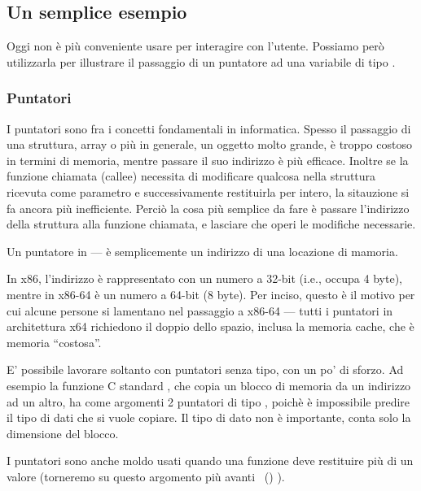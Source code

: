 \subsection{Un semplice esempio}



Oggi non è più conveniente usare \scanf per interagire con l'utente. 
Possiamo però utilizzarla per illustrare il passaggio di un puntatore ad una variabile di tipo \Tint.

\subsubsection{Puntatori}
\myindex{\CLanguageElements!\Pointers}

I puntatori sono fra i concetti fondamentali in informatica.
Spesso il passaggio di una struttura, array o più in generale, un oggetto molto grande, è troppo costoso in termini di memoria, mentre passare il suo indirizzo è più efficace. 
Inoltre se la funzione chiamata (\gls{callee}) necessita di modificare qualcosa nella struttura ricevuta come parametro e successivamente restituirla per intero, la sitauzione si fa ancora più inefficiente.
Perciò la cosa più semplice da fare è passare l'indirizzo della struttura alla funzione chiamata, e lasciare che operi le modifiche necessarie.

Un puntatore in \CCpp--- è semplicemente un indirizzo di una locazione di mamoria.

In x86, l'indirizzo è rappresentato con un numero a 32-bit (i.e., occupa 4 byte), mentre in x86-64 è un numero a 64-bit (8 byte).
Per inciso, questo è il motivo per cui alcune persone si lamentano nel passaggio a x86-64 --- tutti i puntatori in architettura x64 richiedono il doppio dello spazio, inclusa la memoria cache, che è memoria ``costosa''.

E' possibile lavorare soltanto con puntatori senza tipo, con un po' di sforzo. Ad esempio la funzione C standard , che copia un blocco di memoria da un indirizzo ad un altro, ha come argomenti 2 puntatori di tipo , poichè è impossibile predire il tipo di dati che si vuole copiare. Il tipo di dato non è importante, conta solo la dimensione del blocco.

I puntatori sono anche moldo usati quando una funzione deve restituire più di un valore
(torneremo su questo argomento più avanti
~()
).


